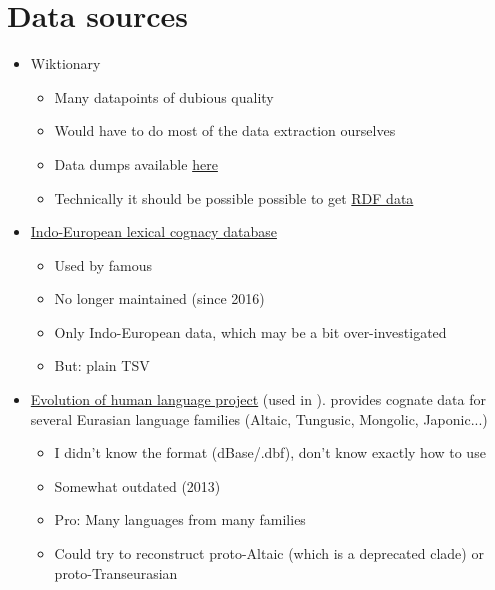 \documentclass[a4paper, 10pt]{article}
\begin{document}
\section{Data sources} 
\begin{itemize}
    \item Wiktionary 
    \begin{itemize}
        \item Many datapoints of dubious quality
        \item Would have to do most of the data extraction ourselves
        \item Data dumps available \href{https://dumps.wikimedia.org/enwiktionary/}{here}
        \item Technically it should be possible possible to get \href{https://wiki.dbpedia.org/wiktionary-rdf-extraction}{RDF data}
    \end{itemize}
    \item \href{http://ielex.mpi.nl/}{Indo-European lexical cognacy database}
    \begin{itemize}
        \item Used by famous \cite{bouckaert_et_al:2012}
        \item No longer maintained (since 2016)
        \item Only Indo-European data, which may be a bit over-investigated
        \item But: plain TSV
    \end{itemize}
    \item \href{https://starling.rinet.ru/downl.php?lan=en}{Evolution of human language project} (used in \cite{hruschka_detecting_2015}).
    provides cognate data for several Eurasian language families (Altaic, Tungusic, Mongolic, Japonic...)
    \begin{itemize}
        \item I didn't know the format (dBase/.dbf), don't know exactly how to use 
        \item Somewhat outdated (2013)
        \item Pro: Many languages from many families
        \item Could try to reconstruct proto-Altaic (which is a deprecated clade) or proto-Transeurasian
    \end{itemize}
\end{itemize}

\end{document}
